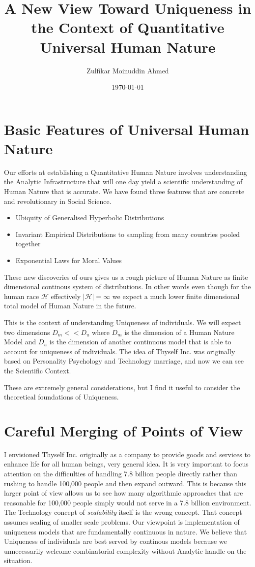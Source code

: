 \documentclass{amsart}
\title{A New View Toward Uniqueness in the Context of Quantitative Universal Human Nature}
\author{Zulfikar Moinuddin Ahmed}
\date{\today}
\begin{document}
\maketitle

\section{Basic Features of Universal Human Nature}

Our efforts at establishing a Quantitative Human Nature involves understanding the Analytic Infrastructure that will one day yield a scientific understanding of Human Nature that is accurate.  We have found three features that are concrete and revolutionary in Social Science.  

\begin{itemize}
\item Ubiquity of Generalised Hyperbolic Distributions
\item Invariant Empirical Distributions to sampling from many countries pooled together
\item Exponential Laws for Moral Values
\end{itemize}
These new discoveries of ours gives us a rough picture of Human Nature as finite dimensional continous system of distributions.  In other words even though for the human race $\mathcal{H}$ effectively $|\mathcal{H}| = \infty$ we expect a much lower finite dimensional total model of Human Nature in the future.

This is the context of understanding Uniqueness of individuals.  We will expect two dimensions $D_m << D_u$ where $D_m$ is the dimension of a Human Nature Model and $D_u$ is the dimension of another continuous model that is able to account for uniqueness of individuals.  The idea of Thyself Inc. was originally based on Personality Psychology and Technology marriage, and now we can see the Scientific Context.  

These are extremely general considerations, but I find it useful to consider the theoretical foundations of Uniqueness. 

\section{Careful Merging of Points of View}

I envisioned Thyself Inc. originally as a company to provide goods and services to enhance life for all human beings, very general idea.  It is very important to focus attention on the difficulties of handling 7.8 billion people directly rather than rushing to handle 100,000 people and then expand outward.  This is because this larger point of view allows us to see how many algorithmic approaches that are reasonable for 100,000 people simply would not serve in a 7.8 billion environment.  The Technology concept of {\em scalability} itself is the wrong concept.  That concept assumes scaling of smaller scale problems.  Our viewpoint is implementation of uniqueness models that are fundamentally continuous in nature.  We believe that Uniqueness of individuals are best served by continous models because we unnecessarily welcome combinatorial complexity without Analytic handle on the situation.
\end{document}

